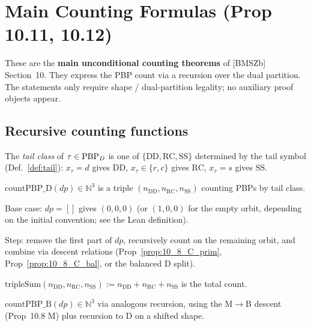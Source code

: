 \chapter{Main Counting Formulas (Prop 10.11, 10.12)}
\label{chap:counting}

These are the \textbf{main unconditional counting theorems} of [BMSZb]
Section~10. They express the PBP count via a recursion over the dual
partition. The statements only require shape / dual-partition legality; no
auxiliary proof objects appear.

\section{Recursive counting functions}

\begin{definition}
  \label{def:tailClass_D}
  \leanok
  The \emph{tail class} of $\tau \in \mathrm{PBP}_D$ is one of $\{\mathrm{DD}, \mathrm{RC}, \mathrm{SS}\}$
  determined by the tail symbol (Def.~\ref{def:tail}): $x_\tau = d$ gives $\mathrm{DD}$,
  $x_\tau \in \{r, c\}$ gives $\mathrm{RC}$, $x_\tau = s$ gives $\mathrm{SS}$.
\end{definition}

\begin{definition}
  \label{def:countPBP_D}
  \leanok
  $\mathrm{countPBP\_D}(dp) \in \mathbb{N}^3$ is a triple
  $(n_{\mathrm{DD}}, n_{\mathrm{RC}}, n_{\mathrm{SS}})$ counting PBPs by tail class.

  Base case: $dp = []$ gives $(0, 0, 0)$ (or $(1, 0, 0)$ for the empty orbit, depending on
  the initial convention; see the Lean definition).

  Step: remove the first part of $dp$, recursively count on the remaining orbit, and
  combine via descent relations (Prop~\ref{prop:10_8_C_prim}, Prop~\ref{prop:10_8_C_bal},
  or the balanced D split).

  $\mathrm{tripleSum}(n_{\mathrm{DD}}, n_{\mathrm{RC}}, n_{\mathrm{SS}}) := n_{\mathrm{DD}} + n_{\mathrm{RC}} + n_{\mathrm{SS}}$ is the total count.
\end{definition}

\begin{definition}
  \label{def:countPBP_B}
  \leanok
  $\mathrm{countPBP\_B}(dp) \in \mathbb{N}^3$ via analogous recursion, using
  the M$\to$B descent (Prop~10.8 M) plus recursion to D on a shifted shape.
\end{definition}

